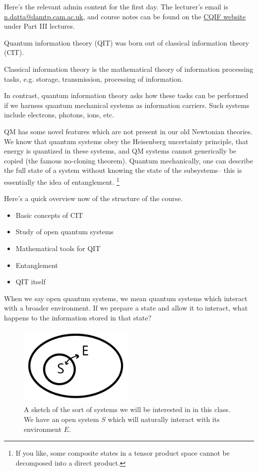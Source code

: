 \begin{note}
    Here's the relevant admin content for the first day. The lecturer's email is \url{n.datta@damtp.cam.ac.uk}, and course notes can be found on the \href{http://www.qi.damtp.cam.ac.uk/node/223}{CQIF website} under Part III lectures.
\end{note}

Quantum information theory (QIT) was born out of classical information theory (CIT).
\begin{defn}
Classical information theory is the mathematical theory of information processing tasks, e.g. storage, transmission, processing of information.
\end{defn}
In contrast, quantum information theory asks how these tasks can be performed if we harness quantum mechanical systems as information carriers. Such systems include electrons, photons, ions, etc.

QM has some novel features which are not present in our old Newtonian theories. We know that quantum systems obey the Heisenberg uncertainty principle, that energy is quantized in these systems, and QM systems cannot generically be copied (the famous no-cloning theorem).
Quantum mechanically, one can describe the full state of a system without knowing the state of the subsystems-- this is essentially the idea of entanglement.%
    \footnote{If you like, some composite states in a tensor product space cannot be decomposed into a direct product.}

Here's a quick overview now of the structure of the course.
\begin{itemize}
    \item Basic concepts of CIT
    \item Study of open quantum systems
    \item Mathematical tools for QIT
    \item Entanglement
    \item QIT itself
\end{itemize}
When we say open quantum systems, we mean quantum systems which interact with a broader environment. If we prepare a state and allow it to interact, what happens to the information stored in that state?

\begin{figure}
    \centering
    \includegraphics[width=0.5\textwidth]{2019/01/20190118_opensystem.png}
    \caption{A sketch of the sort of systems we will be interested in in this class. We have an open system $S$ which will naturally interact with its environment $E$.}
    \label{fig:opensystem}
\end{figure}
